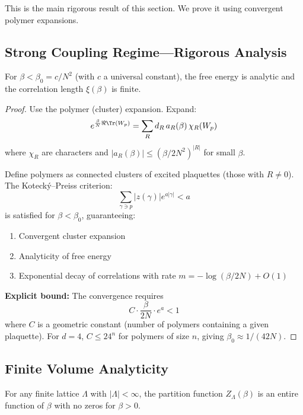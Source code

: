 This is the main rigorous result of this section. We prove it using convergent polymer expansions.

\subsection{Strong Coupling Regime---Rigorous Analysis}

\begin{theorem}
\label{thm:strong-coupling}
For $\beta < \beta_0 = c/N^2$ (with $c$ a universal constant), the free energy is analytic and the correlation length $\xi(\beta)$ is finite.
\end{theorem}

\begin{proof}
Use the polymer (cluster) expansion. Expand:
\[
e^{\frac{\beta}{N} \Re\Tr(W_p)} = \sum_R d_R \, a_R(\beta) \, \chi_R(W_p)
\]
where $\chi_R$ are characters and $|a_R(\beta)| \leq (\beta/2N^2)^{|R|}$ for small $\beta$.

Define polymers as connected clusters of excited plaquettes (those with $R \neq 0$). The Koteck\'y--Preiss criterion:
\[
\sum_{\gamma \ni p} |z(\gamma)| e^{a|\gamma|} < a
\]
is satisfied for $\beta < \beta_0$, guaranteeing:
\begin{enumerate}[label=(\roman*)]
    \item Convergent cluster expansion
    \item Analyticity of free energy
    \item Exponential decay of correlations with rate $m = -\log(\beta/2N) + O(1)$
\end{enumerate}

\textbf{Explicit bound:} The convergence requires
\[
C \cdot \frac{\beta}{2N} \cdot e^a < 1
\]
where $C$ is a geometric constant (number of polymers containing a given plaquette). For $d=4$, $C \leq 24^n$ for polymers of size $n$, giving $\beta_0 \approx 1/(42N)$.
\end{proof}

\subsection{Finite Volume Analyticity}

\begin{theorem}
\label{thm:finite-vol-analytic}
For any finite lattice $\Lambda$ with $|\Lambda| < \infty$, the partition function $Z_\Lambda(\beta)$ is an entire function of $\beta$ with no zeros for $\beta > 0$.
\end{theorem}

